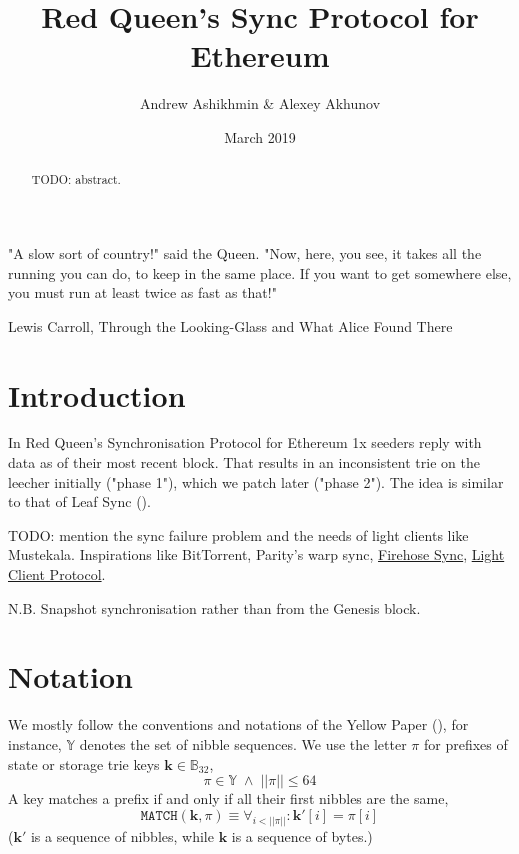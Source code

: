 \documentclass{amsart}
\begin{document}
\pagecolor{white}

\title{Red Queen's Sync Protocol for Ethereum}
\author{Andrew Ashikhmin \& Alexey Akhunov}
\date{March 2019}

\begin{abstract}
TODO: abstract.
\end{abstract}

\maketitle

\epigraph{
    "A slow sort of country!" said the Queen.
    "Now, here, you see, it takes all the running you can do, to keep in the same place.
    If you want to get somewhere else, you must run at least twice as fast as that!"
    }{Lewis Carroll, Through the Looking-Glass and What Alice Found There}

\section{Introduction}

In Red Queen's Synchronisation Protocol for Ethereum 1x seeders reply with data as of their most recent block.
That results in an inconsistent trie on the leecher initially ("phase 1"), which we patch later ("phase 2").
The idea is similar to that of Leaf Sync (\cite{leaf_sync}).

TODO: mention the sync failure problem \cite{akhunov_1x_workshop_part1} and the needs of light clients like Mustekala.
Inspirations like BitTorrent, Parity's warp sync,
\href{https://notes.ethereum.org/eXnqtO_vQquzrFDPHjuaFQ}{Firehose Sync},
\href{https://github.com/ethereum/wiki/wiki/Light-client-protocol}{Light Client Protocol}.

N.B. Snapshot synchronisation rather than from the Genesis block.



\section{Notation}

We mostly follow the conventions and notations of the Yellow Paper (\cite{yellow_paper}),
for instance, $\mathbb{Y}$ denotes the set of nibble sequences.
We use the letter $\pi$ for prefixes of state or storage trie keys $\mathbf{k} \in \mathbb{B}_{32}$,
\begin{equation}
    \pi \in \mathbb{Y} \; \land \; ||\pi|| \leq 64
\end{equation}
A key matches a prefix if and only if all their first nibbles are the same,
\begin{equation}
    \texttt{MATCH}(\mathbf{k}, \pi) \equiv \forall_{i < ||\pi||}: \mathbf{k}'[i] = \pi[i]
\end{equation}
($\mathbf{k}'$ is a sequence of nibbles, while $\mathbf{k}$ is a sequence of bytes.)
\end{document}

